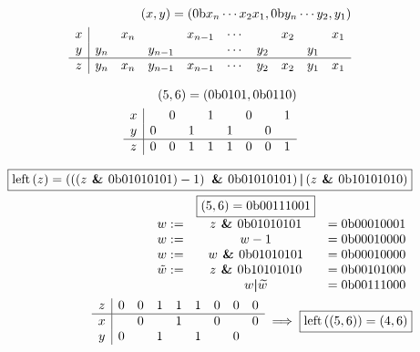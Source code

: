 \documentclass{article}
\newcommand{\bb}{0\textrm{b}}
\newcommand{\AND}{\textrm{\textbf{ \& }}}
\newcommand{\OR}{\textrm{\textbf{\textbar }}}
\begin{document}
\begin{subequations}
    \begin{align}
    \left( x, y \right) = \left( \bb x_n \cdots x_2 x_1, \bb y_n \cdots y_2,
    y_1 \right) \\
    \begin{array} {c|c c c c c c c c c}
        x & & x_n & & x_{n-1} & \cdots & & x_2 & & x_1 \\
        y & y_n & & y_{n-1} & & \cdots & y_2 & & y_1 \\
    \hline
    z & y_n & x_n & y_{n-1} & x_{n-1} & \cdots & y_2 & x_2 & y_1 & x_1
    \end{array}
    \end{align}
\end{subequations}

\begin{subequations}
    \begin{align}
    \left( 5, 6 \right) = \left( \bb 0 1 0 1, \bb 0 1 1 0 \right) \\
    \begin{array} {c|c c c c c c c c c}
        x & & 0 & & 1 & & 0 & & 1 \\
        y & 0 & & 1 & & 1 & & 0 \\
    \hline
    z & 0 & 0 & 1 & 1 & 1 & 0 & 0 & 1
    \end{array}
    \end{align}
\end{subequations}

\begin{subequations}
    \begin{align}
        \boxed{%
        \textrm{left}\left(z\right) = \left(\left(\left(
            z \AND \bb01010101 \right) - 1 \right) \AND \bb01010101 \right)
            \OR \left( z \AND \bb10101010 \right)
        }\\
            \begin{array}{c c c}
                & \boxed{\left( 5, 6 \right) = \bb00111001} & \\
                w :=& z \AND \bb01010101 &= \bb00010001 \\
                w :=& w - 1 &= \bb00010000 \\
                w :=& w \AND \bb01010101 &= \bb00010000 \\
                \tilde{w} :=& z \AND \bb10101010 &= \bb00101000 \\
                & w \OR \widetilde{w} &= \bb00111000
            \end{array} \\
            \begin{array}{c | c c c c c c c c}
                z & 0 & 0 & 1 & 1 & 1 & 0 & 0 & 0 \\
                \hline
                x & & 0 & & 1 & & 0 & & 0 \\
                y & 0 & & 1 & & 1 & & 0 \\
            \end{array}
            \implies \boxed{\textrm{left}\left(\left(5, 6\right)\right) =
            \left(4, 6\right)}
    \end{align}
\end{subequations}
\end{document}

